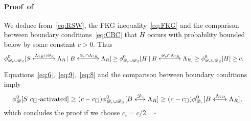 \documentclass[a4paper,oneside,11pt]{article}
\numberwithin{equation}{section}
\numberwithin{equation}{section}
\numberwithin{equation}{section}
\newenvironment{proof}[1][\relax]%
  {\paragraph{Proof\ifx#1\relax\else~of #1\fi}}%
  {~\hfill$\square$\par\bigskip}
\newcommand{\calD}{\mathcal{D}}
\begin{document}
\begin{proof}
We deduce from~\eqref{eq:RSW}, the FKG inequality~\eqref{eq:FKG} and the comparison between boundary conditions~\eqref{eq:CBC} that 
$H$ occurs with probability bounded below by some constant $c > 0$. Thus
\begin{align}\label{eq:8}
 &\phi_{\calD_r\cup\calD_S}^0[S \xleftrightarrow{\Lambda_{7R}\cup\mathcal D_S}\Lambda_R\: | \: B\xleftrightarrow{\calD_r\cap\Lambda_{7R}} \Lambda_R] \ge\phi_{\calD_r\cup\calD_S}^0[H\: | \: B\xleftrightarrow{\calD_r\cap\Lambda_{7R}} \Lambda_R]\ge \phi_{\calD_r\cup\calD_{S}}^0[H]
	\ge c.
\end{align}

Equations~\eqref{eq:6},~\eqref{eq:9},~\eqref{eq:8} and the comparison between boundary conditions imply 
\begin{align*}
	\phi_{\calD}^0[S\text{ $c_\square$-activated}]
	\ge(c-c_\square)\phi_{\calD_r\cup\calD_{S}}^0[B\xleftrightarrow{\calD_r}   \Lambda_R]
	\ge(c-c_\square)\phi_{\calD_r}^0[B\xleftrightarrow{\Lambda_{7R}} \Lambda_R],
\end{align*}
which concludes the proof if we choose $c_\square=c/2$.
\end{proof}
\end{document}
